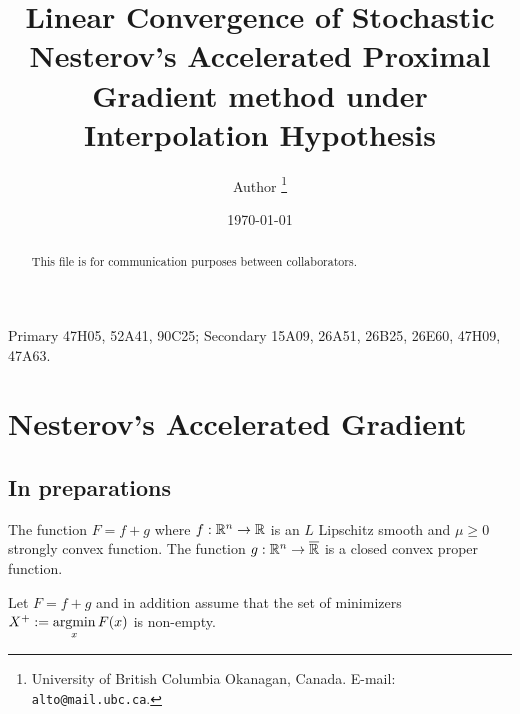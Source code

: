 \documentclass[12pt]{article}
\begin{document}
\title{{\selectfont Linear Convergence of Stochastic Nesterov's Accelerated Proximal Gradient method under Interpolation Hypothesis}}

\author{
    Author
    \thanks{
        University of British Columbia Okanagan,
        Canada. E-mail: \texttt{alto@mail.ubc.ca}.
    }
}

\date{\today}

\maketitle
{}

\begin{abstract} 
    This file is for communication purposes between collaborators. 

\end{abstract}

Primary 47H05, 52A41, 90C25; Secondary 15A09, 26A51, 26B25, 26E60, 47H09, 47A63.


\section{Nesterov's Accelerated Gradient}
    \subsection{In preparations}
        \begin{assumption}\label{ass:smooth-plus-nonsmooth}
            The function $F = f + g$ where $f:\mathbb R^n \rightarrow \mathbb R$ is an $L$ Lipschitz smooth and $\mu \ge 0$ strongly convex function. 
            The function $g:\mathbb R^n \rightarrow \overline {\mathbb R}$ is a closed convex proper function. 
        \end{assumption}
        \begin{assumption}\label{ass:smooth-plus-nonsmooth-x}
            Let $F = f + g$ and in addition assume that the set of minimizers $X^+ := \mathop{\rm argmin}\limits_{x}F(x)$ is non-empty. 
        \end{assumption}
\end{document}
